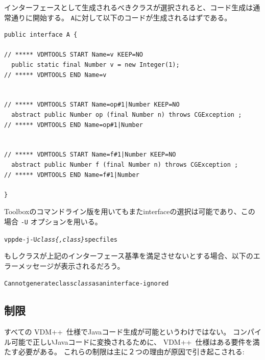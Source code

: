 \documentclass[\pformat,11pt]{jarticle}
\newcommand{\VDM}{VDM++}
\begin{document}
インターフェースとして生成されるべきクラスが選択されると、コード生成は通常通りに開始する。
\texttt{A}に対して以下のコードが生成されるはずである。

\begin{screen}
\begin{verbatim}
public interface A {
 
// ***** VDMTOOLS START Name=v KEEP=NO
  public static final Number v = new Integer(1);
// ***** VDMTOOLS END Name=v


// ***** VDMTOOLS START Name=op#1|Number KEEP=NO
  abstract public Number op (final Number n) throws CGException ;
// ***** VDMTOOLS END Name=op#1|Number


// ***** VDMTOOLS START Name=f#1|Number KEEP=NO
  abstract public Number f (final Number n) throws CGException ;
// ***** VDMTOOLS END Name=f#1|Number

} 
\end{verbatim}
\end{screen}

Toolboxのコマンドライン版を用いてもまたinterfaceの選択は可能であり、この場合 \texttt{-U} オプションを用いる。
\begin{screen}
\begin{alltt}
vppde -j -U \textit{class\{,class\}} specfiles
\end{alltt}
\end{screen}

もしクラスが上記のインターフェース基準を満足させないとする場合、以下のエラーメッセージが表示されるだろう。

\begin{screen}
\begin{alltt}
Can not generate class \textit{class} as an interface - ignored
\end{alltt}
\end{screen}



\subsection{制限}\label{sec:unsupported}

すべての \VDM\ 仕様でJavaコード生成が可能というわけではない。 
コンパイル可能で正しいJavaコードに変換されるために、 \VDM\ 仕様はある要件を満たす必要がある。
これらの制限は主に２つの理由が原因で引き起こされる: 
\end{document}
